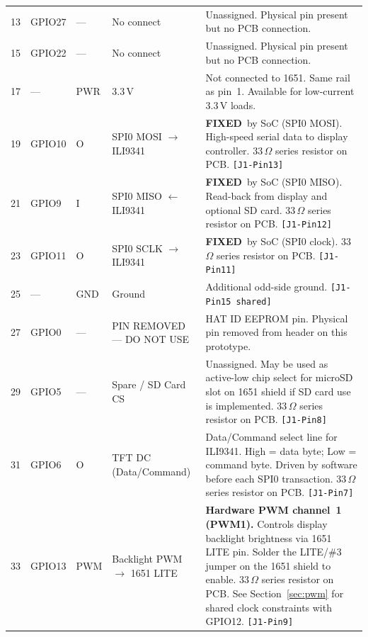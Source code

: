 \documentclass[11pt,a4paper]{article}
\newcommand{\fixed}{\textbf{FIXED}}
\newcommand{\na}{---}
\newcommand{\jref}[1]{\texttt{\small[#1]}}
\begin{document}
\begin{longtable}{C{0.85cm} C{1.2cm} C{0.65cm} L{3.2cm} L{8.1cm}}
  13 & GPIO27 & \na & No connect &
    Unassigned. Physical pin present but no PCB connection. \\

  15 & GPIO22 & \na & No connect &
    Unassigned. Physical pin present but no PCB connection. \\

  17 & \na & PWR & 3.3\,V &
    Not connected to 1651. Same rail as pin~1.
    Available for low-current 3.3\,V loads. \\

  19 & GPIO10 & O & SPI0 MOSI $\to$ ILI9341 &
    \fixed\ by SoC (SPI0 MOSI). High-speed serial data to display controller.
    33\,$\Omega$ series resistor on PCB.
    \jref{J1-Pin13} \\

  21 & GPIO9 & I & SPI0 MISO $\leftarrow$ ILI9341 &
    \fixed\ by SoC (SPI0 MISO). Read-back from display and optional SD card.
    33\,$\Omega$ series resistor on PCB.
    \jref{J1-Pin12} \\

  23 & GPIO11 & O & SPI0 SCLK $\to$ ILI9341 &
    \fixed\ by SoC (SPI0 clock).
    33\,$\Omega$ series resistor on PCB.
    \jref{J1-Pin11} \\

  25 & \na & GND & Ground &
    Additional odd-side ground.
    \jref{J1-Pin15 shared} \\

  27 & GPIO0 & \na & PIN REMOVED --- DO NOT USE &
    HAT ID EEPROM pin. Physical pin removed from header on this prototype. \\

  29 & GPIO5 & \na & Spare / SD Card CS &
    Unassigned. May be used as active-low chip select for
    microSD slot on 1651 shield if SD card use is implemented.
    33\,$\Omega$ series resistor on PCB.
    \jref{J1-Pin8} \\

  31 & GPIO6 & O & TFT DC (Data/Command) &
    Data/Command select line for ILI9341.
    High = data byte; Low = command byte.
    Driven by software before each SPI0 transaction.
    33\,$\Omega$ series resistor on PCB.
    \jref{J1-Pin7} \\

  33 & GPIO13 & PWM & Backlight PWM $\to$ 1651 LITE &
    \textbf{Hardware PWM channel~1 (PWM1).}
    Controls display backlight brightness via 1651 LITE pin.
    Solder the LITE/\#3 jumper on the 1651 shield to enable.
    33\,$\Omega$ series resistor on PCB.
    See Section~\ref{sec:pwm} for shared clock constraints with GPIO12.
    \jref{J1-Pin9} \\


\end{longtable}
\end{document}

